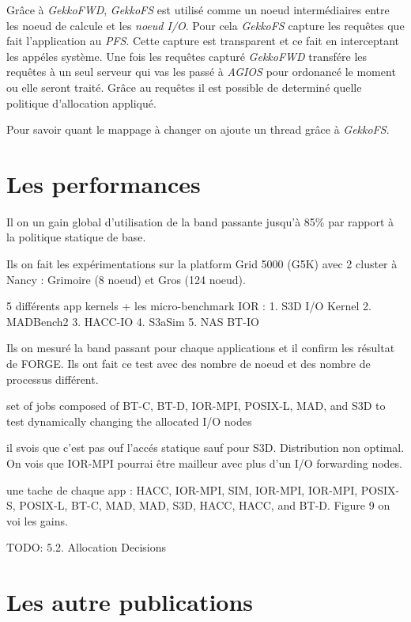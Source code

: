 \documentclass[10pt, a4paper]{article}
\begin{document}
Grâce à \emph{GekkoFWD}, \emph{GekkoFS} est utilisé comme un noeud intermédiaires entre les noeud de calcule et les \emph{noeud I/O}. Pour cela \emph{GekkoFS} capture les requêtes que fait l'application au \emph{PFS}. Cette capture est transparent et ce fait en interceptant les appéles système. Une fois les requêtes capturé \emph{GekkoFWD} transfére les requêtes à un seul serveur qui vas les passé à \emph{AGIOS} pour ordonancé le moment ou elle seront traité. Grâce au requêtes il est possible de determiné quelle politique d'allocation appliqué.

Pour savoir quant le mappage à changer on ajoute un thread grâce à \emph{GekkoFS}.


\section{Les performances}


Il on un gain global d'utilisation de la band passante jusqu'à 85\% par rapport à la politique statique de base.


Ils on fait les expérimentations sur la platform Grid 5000 (G5K) avec 2 cluster à Nancy : Grimoire (8 noeud) et Gros (124 noeud). %

5 différents app kernels + les micro-benchmark IOR :
1. S3D I/O Kernel
2. MADBench2
3. HACC-IO
4. S3aSim
5. NAS BT-IO

Ils on mesuré la band passant pour chaque applications et il confirm les résultat de FORGE. Ils ont fait ce test avec des nombre de noeud et des nombre de processus différent.

set of jobs composed of BT-C, BT-D, IOR-MPI, POSIX-L, MAD, and S3D to test dynamically changing the allocated I/O nodes

il svois que c'est pas ouf l'accés statique sauf pour S3D. Distribution non optimal. On vois que IOR-MPI pourrai être mailleur avec plus d'un I/O forwarding nodes.

une tache de chaque app : HACC, IOR-MPI, SIM, IOR-MPI, IOR-MPI, POSIX-S, POSIX-L, BT-C, MAD, MAD, S3D, HACC, HACC, and BT-D. Figure 9 on voi les gains.



TODO: 5.2. Allocation Decisions


\section{Les autre publications}
\end{document}
